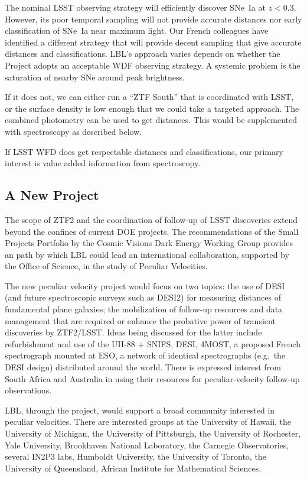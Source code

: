 The nominal LSST observing strategy will efficiently discover SNe~Ia at $z<0.3$.  However, its poor temporal sampling will not provide accurate
distances nor early classification of SNe~Ia near maximum light.  Our French colleagues have identified a different strategy that will provide
decent sampling that give accurate distances and classifications.  LBL's approach varies depends on whether the Project adopts an acceptable
WDF observing strategy.  A systemic problem is the saturation of nearby SNe around peak brightness.

If it does not, we can either run a ``ZTF South'' that is coordinated with LSST, or the surface density is low enough that we could take
a targeted approach.  The combined photometry can be used to get distances.  This would be supplemented with spectroscopy as described below.

If LSST WFD does get respectable distances and classifications, our primary interest is value added information from spectroscopy.

\subsection{A New Project}
The scope of ZTF2 and the coordination of follow-up of LSST discoveries extend beyond the confines
of current DOE projects.  The recommendations
of the  Small Projects Portfolio  by the  Cosmic Visions Dark Energy Working Group
provides an path by which LBL could lead an international collaboration,
supported by the Office of Science, in the study of Peculiar Velocities.

The new peculiar velocity project would focus on two topics: the use of DESI (and future spectroscopic surveys
such as DESI2) for measuring distances of
fundamental plane galaxies; the mobilization of follow-up resources and data management that are required or enhance 
the probative power of transient discoveries by ZTF2/LSST.  Ideas being discussed for the latter include
refurbishment and use of the
UH-88 + SNIFS, DESI, 4MOST, a proposed French spectrograph mounted at ESO,
a network of identical spectrographs (e.g.\ the DESI design) distributed around the world.
There is expressed interest from South Africa and Australia in using their resources for peculiar-velocity follow-up observations.

LBL, through the project, would support a broad community interested in peculiar velocities. 
There are interested groups at the  University of Hawaii, the University of Michigan, the University of Pittsburgh, the University of Rochester, Yale University,  Brookhaven National Laboratory,
the Carnegie Observatories, several IN2P3 labs, Humboldt University, the University of Toronto,  the University of Queensland, African Institute for Mathematical
Sciences.